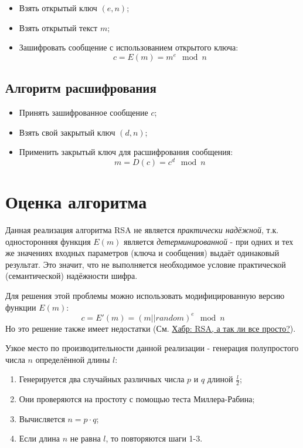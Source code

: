 \documentclass[utf8x, 14pt, bold, times]{G7-32} %
\begin{document}
\begin{itemize}
\item Взять открытый ключ $(e, n)$;
\item Взять открытый текст $m$;
\item Зашифровать сообщение с использованием открытого ключа:
      \begin{equation}
        c = E(m) = m^e \mod n
      \end{equation}
\end{itemize}

\section{Алгоритм расшифрования}

\begin{itemize}
\item Принять зашифрованное сообщение $c$;
\item Взять свой закрытый ключ $(d, n)$;
\item Применить закрытый ключ для расшифрования сообщения:
      \begin{equation}
        m = D(c) =c^d \mod n
      \end{equation}
\end{itemize}

\chapter{Оценка алгоритма}

Данная реализация алгоритма RSA не является \textsl{практически надёжной},
т.к. односторонняя функция $E(m)$ является \textsl{детерминированной} - при
одних и тех же значениях входных параметров (ключа и сообщения) выдаёт одинаковый
результат. Это значит, что не выполняется необходимое условие практической
(семантической) надёжности шифра.

Для решения этой проблемы можно использовать модифицированную версию функции $E(m)$:
\begin{equation}
  c = E'(m) = (m||random)^e \mod n
\end{equation}
Но это решение также имеет недостатки (См. \href{https://habr.com/ru/post/99376/}{Хабр: RSA, а так ли все просто?}).

Узкое место по производительности данной реализации - генерация полупростого числа $n$
определённой длины $l$: 
\begin{enumerate}
\item Генерируется два случайных различных числа $p$ и $q$ длиной $\frac{l}{2}$;
\item Они проверяются на простоту с помощью теста Миллера-Рабина;
\item Вычисляется $n = p \cdot q$;
\item Если длина $n$ не равна $l$, то повторяются шаги 1-3.
\end{enumerate}
\end{document}

